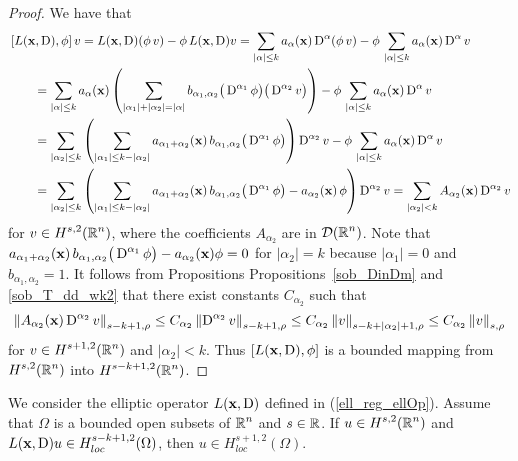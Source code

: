 \begin{proof}
We have that
\begin{align*}
&\left[ L(\mathbf{x},\operatorname{D}), \phi\right] v
= L(\mathbf{x},\operatorname{D}) (\phi\, v) - \phi\, L(\mathbf{x},\operatorname{D}) v
= \sum_{|\alpha|\leq k} a_\alpha(\mathbf{x}) \operatorname{D}^\alpha (\phi\, v)
- \phi\, \sum_{|\alpha|\leq k} a_\alpha(\mathbf{x}) \operatorname{D}^\alpha v \\
&\qquad = \sum_{|\alpha|\leq k} a_\alpha(\mathbf{x})
\left( \sum_{|\alpha_1|+|\alpha_2|=|\alpha|} b_{\alpha_1,\alpha_2}
  \big(\operatorname{D}^{\alpha_1} \phi\big)\big(\operatorname{D}^{\alpha_2} v\big) \right)
- \phi\, \sum_{|\alpha|\leq k} a_\alpha(\mathbf{x}) \operatorname{D}^\alpha v \\
&\qquad = \sum_{|\alpha_2|\leq k} \left( \sum_{|\alpha_1|\leq k-|\alpha_2|} 
a_{\alpha_1+\alpha_2}(\mathbf{x})\, b_{\alpha_1,\alpha_2}
\big(\operatorname{D}^{\alpha_1} \phi\big) \right) \operatorname{D}^{\alpha_2} v
- \phi\, \sum_{|\alpha|\leq k} a_\alpha(\mathbf{x}) \operatorname{D}^\alpha v \\
&\qquad =\sum_{|\alpha_2|\leq k} \left( \sum_{|\alpha_1|\leq k-|\alpha_2|} 
a_{\alpha_1+\alpha_2}(\mathbf{x})\, b_{\alpha_1,\alpha_2}
\big(\operatorname{D}^{\alpha_1} \phi\big) - a_{\alpha_2}(\mathbf{x})\,\phi \right)
\operatorname{D}^{\alpha_2} v
= \sum_{|\alpha_2|< k} A_{\alpha_2}(\mathbf{x}) \operatorname{D}^{\alpha_2} v
\end{align*}
for $\displaystyle v \in H^{s,2}(\mathbb{R}^n)$,
where the coefficients $A_{\alpha_2}$ are in $\displaystyle \mathcal{D}(\mathbb{R}^n)$.
Note that $\displaystyle a_{\alpha_1+\alpha_2}(\mathbf{x})\, b_{\alpha_1,\alpha_2}
\big(\operatorname{D}^{\alpha_1} \phi\big) - a_{\alpha_2}(\mathbf{x})\phi = 0$ for
$|\alpha_2| = k$ because $|\alpha_1|=0$ and $b_{\alpha_1,\alpha_2} = 1$.
It follows from Propositions Propositions~\ref{sob_DinDm} and
\ref{sob_T_dd_wk2} that there exist
constants $C_{\alpha_2}$ such that
\begin{equation} \label{ellRegInLem1Eq1}
\left\| A_{\alpha_2}(\mathbf{x}) \operatorname{D}^{\alpha_2} v \right\|_{s-k+1,\rho}
\leq C_{\alpha_2} \left\| \operatorname{D}^{\alpha_2} v \right\|_{s-k+1,\rho}
\leq C_{\alpha_2} \left\| v \right\|_{s-k+|\alpha_2|+1,\rho}
\leq C_{\alpha_2} \left\| v \right\|_{s,\rho}
\end{equation}
for $\displaystyle v \in H^{s+1,2}(\mathbb{R}^n)$ and $|\alpha_2|<k$.  Thus
$\left[ L(\mathbf{x},\operatorname{D}), \phi\right]$ is a bounded mapping from
$\displaystyle H^{s,2}(\mathbb{R}^n)$ into $\displaystyle H^{s-k+1,2}(\mathbb{R}^n)$.
\end{proof}

\begin{lemma} \label{ell_reg_in_lem2}
We consider the elliptic operator $L(\mathbf{x},\operatorname{D})$ defined in
(\ref{ell_reg_ellOp}).  Assume that $\Omega$ is a bounded open subsets of
$\displaystyle \mathbb{R}^n$ and $s\in \mathbb{R}$.  If $\displaystyle u\in H^{s,2}(\mathbb{R}^n)$
and $\displaystyle L(\mathbf{x},\operatorname{D}) u \in H^{s-k+1,2}_{loc}(\Omega)$, then
$\displaystyle u \in H^{s+1,2}_{loc}(\Omega)$.
\end{lemma}

